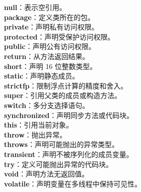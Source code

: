 \documentclass[12pt,a4paper]{article}
\begin{document}
\textbf{null}：表示空引用。\\
\textbf{package}：定义类所在的包。\\
\textbf{private}：声明私有访问权限。\\
\textbf{protected}：声明受保护访问权限。\\
\textbf{public}：声明公有访问权限。\\
\textbf{return}：从方法返回结果。\\
\textbf{short}：声明 16 位整数类型。\\
\textbf{static}：声明静态成员。\\
\textbf{strictfp}：限制浮点计算的精度和舍入。\\
\textbf{super}：引用父类的成员或构造方法。\\
\textbf{switch}：多分支选择语句。\\
\textbf{synchronized}：声明同步方法或代码块。\\
\textbf{this}：引用当前对象。\\
\textbf{throw}：抛出异常。\\
\textbf{throws}：声明可能抛出的异常类型。\\
\textbf{transient}：声明不被序列化的成员变量。\\
\textbf{try}：定义可能抛出异常的代码块。\\
\textbf{void}：声明方法无返回值。\\
\textbf{volatile}：声明变量在多线程中保持可见性。\\
\end{document}
